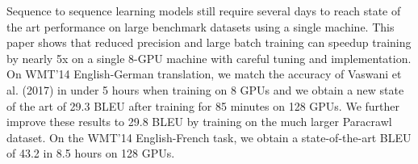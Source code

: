 Sequence to sequence learning models still require several days to reach state of the art performance on large benchmark datasets using a single machine. This paper shows that reduced precision and large batch training can speedup training by nearly 5x on a single 8-GPU machine with careful tuning and implementation. On WMT'14 English-German translation, we match the accuracy of Vaswani et al. (2017) in under 5 hours when training on 8 GPUs and we obtain a new state of the art of 29.3 BLEU after training for 85 minutes on 128 GPUs. We further improve these results to 29.8 BLEU by training on the much larger Paracrawl dataset. On the WMT'14 English-French task, we obtain a state-of-the-art BLEU of 43.2 in 8.5 hours on 128 GPUs.
